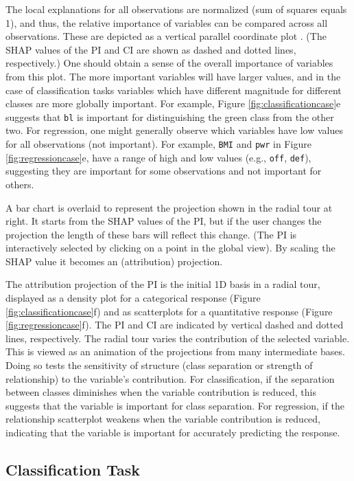 \documentclass[
]{jss}
\begin{document}
The local explanations for all observations are normalized (sum of
squares equals 1), and thus, the relative importance of variables can be
compared across all observations. These are depicted as a vertical
parallel coordinate plot \citep{ocagne_coordonnees_1885}. (The SHAP
values of the PI and CI are shown as dashed and dotted lines,
respectively.) One should obtain a sense of the overall importance of
variables from this plot. The more important variables will have larger
values, and in the case of classification tasks variables which have
different magnitude for different classes are more globally important.
For example, Figure \ref{fig:classificationcase}e suggests that
\texttt{bl} is important for distinguishing the green class from the
other two. For regression, one might generally observe which variables
have low values for all observations (not important). For example,
\texttt{BMI} and \texttt{pwr} in Figure \ref{fig:regressioncase}e, have
a range of high and low values (e.g., \texttt{off}, \texttt{def}),
suggesting they are important for some observations and not important
for others.

A bar chart is overlaid to represent the projection shown in the radial
tour at right. It starts from the SHAP values of the PI, but if the user
changes the projection the length of these bars will reflect this
change. (The PI is interactively selected by clicking on a point in the
global view). By scaling the SHAP value it becomes an (attribution)
projection.

The attribution projection of the PI is the initial 1D basis in a radial
tour, displayed as a density plot for a categorical response (Figure
\ref{fig:classificationcase}f) and as scatterplots for a quantitative
response (Figure \ref{fig:regressioncase}f). The PI and CI are indicated
by vertical dashed and dotted lines, respectively. The radial tour
varies the contribution of the selected variable. This is viewed as an
animation of the projections from many intermediate bases. Doing so
tests the sensitivity of structure (class separation or strength of
relationship) to the variable's contribution. For classification, if the
separation between classes diminishes when the variable contribution is
reduced, this suggests that the variable is important for class
separation. For regression, if the relationship scatterplot weakens when
the variable contribution is reduced, indicating that the variable is
important for accurately predicting the response.

\hypertarget{classification-task}{%
\subsection{Classification Task}\label{classification-task}}
\end{document}
